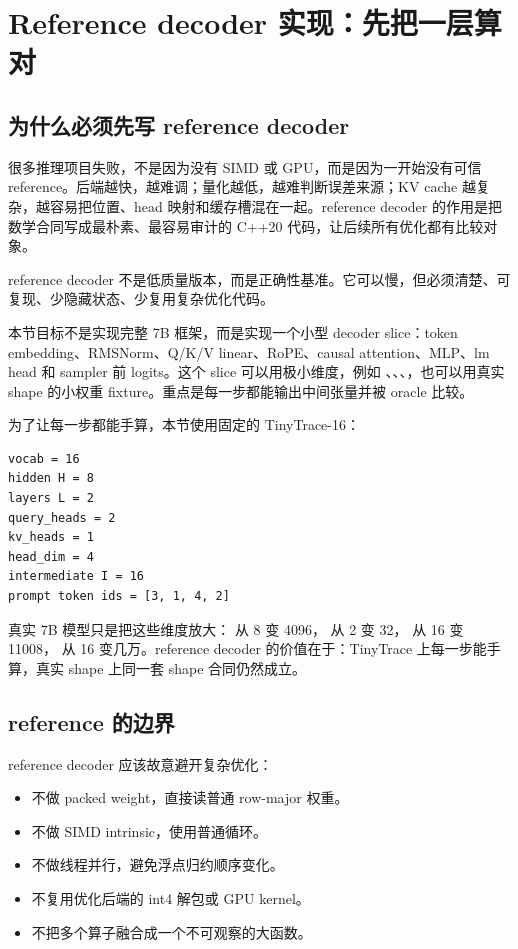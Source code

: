 \section{Reference decoder 实现：先把一层算对}

\subsection{为什么必须先写 reference decoder}

很多推理项目失败，不是因为没有 SIMD 或 GPU，而是因为一开始没有可信 reference。后端越快，越难调；量化越低，越难判断误差来源；KV cache 越复杂，越容易把位置、head 映射和缓存槽混在一起。reference decoder 的作用是把数学合同写成最朴素、最容易审计的 C++20 代码，让后续所有优化都有比较对象。

\begin{keyidea}
reference decoder 不是低质量版本，而是正确性基准。它可以慢，但必须清楚、可复现、少隐藏状态、少复用复杂优化代码。
\end{keyidea}

本节目标不是实现完整 7B 框架，而是实现一个小型 decoder slice：token embedding、RMSNorm、Q/K/V linear、RoPE、causal attention、MLP、lm head 和 sampler 前 logits。这个 slice 可以用极小维度，例如 、、、，也可以用真实 shape 的小权重 fixture。重点是每一步都能输出中间张量并被 oracle 比较。

为了让每一步都能手算，本节使用固定的 TinyTrace-16：

\begin{lstlisting}[numbers=none,caption={TinyTrace-16 decoder 参数}]
vocab = 16
hidden H = 8
layers L = 2
query_heads = 2
kv_heads = 1
head_dim = 4
intermediate I = 16
prompt token ids = [3, 1, 4, 2]
\end{lstlisting}

真实 7B 模型只是把这些维度放大： 从 8 变 4096， 从 2 变 32， 从 16 变 11008， 从 16 变几万。reference decoder 的价值在于：TinyTrace 上每一步能手算，真实 shape 上同一套 shape 合同仍然成立。

\subsection{reference 的边界}

reference decoder 应该故意避开复杂优化：

\begin{itemize}
  \item 不做 packed weight，直接读普通 row-major 权重。
  \item 不做 SIMD intrinsic，使用普通循环。
  \item 不做线程并行，避免浮点归约顺序变化。
  \item 不复用优化后端的 int4 解包或 GPU kernel。
  \item 不把多个算子融合成一个不可观察的大函数。
\end{itemize}

